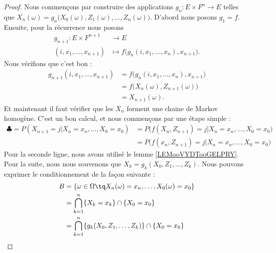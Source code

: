 \begin{proof}
	Nous commençons par construire des applications \( g_n\colon E\times F^n\to E\) telles que \( X_n(\omega)=g_n\big( X_0(\omega), Z_1(\omega),\ldots, Z_n(\omega) \big)\). D'abord nous posons \( g_1=f\). Ensuite, pour la récurrence nous posons
	\begin{equation}
		\begin{aligned}
			g_{n+1}\colon E\times F^{n+1} & \to E                                                 \\
			(i,x_1,\ldots, x_{n+1})       & \mapsto f\big( g_n(i,x_1,\ldots, x_n), x_{n+1} \big).
		\end{aligned}
	\end{equation}
	Nous vérifions que c'est bon :
	\begin{subequations}
		\begin{align}
			g_{n+1}(i,x_1,\ldots, x_{n+1}) & = f\big( g_n(i,x_1,\ldots, x_n), x_{n+1} \big) \\
			                               & =f\big( X_n(\omega),Z_{n+1}(\omega) \big)      \\
			                               & =X_{n+1}(\omega).
		\end{align}
	\end{subequations}
	Et maintenant il faut vérifier que les \( X_n\) forment une chaine de Markov homogène. C'est un bon calcul, et nous commençons par une étape simple :
	\begin{subequations}
		\begin{align}
			\clubsuit=P(X_{n+1}=j|X_n=x_n,\ldots, X_0=x_0) & =P\big( f(X_n,Z_{n+1})=j|X_n=x_n,\ldots, X_0=x_0 \big) \\
			                                               & =P\big( f(x_n,Z_{n+1})=j|X_n=x_n,\ldots, X_0=x_0 \big)
		\end{align}
	\end{subequations}
	Pour la seconde ligne, nous avons utilisé le lemme \ref{LEMooVYDTooGELPRY}. Pour la suite, nous nous souvenons que \( X_k=g_k(X_0,Z_1,\ldots, Z_k)\). Nous pouvons exprimer le conditionnement de la façon suivante :
	\begin{subequations}
		\begin{align}
			B & =\{ \omega\in \Omega\tq X_n(\omega)=x_n,\ldots, X_0(\omega)=x_0 \}      \\
			  & =  \bigcap_{k=1}^n\{ X_k=x_k \}  \cap   \{ X_0=x_0 \}                   \\
			  & =  \bigcap_{k=1}^n\{ g_k(X_0, Z_1,\ldots, Z_k) \}  \cap   \{ X_0=x_0 \} \\

\end{align}
\end{subequations}
\end{proof}
